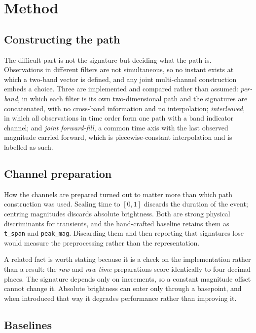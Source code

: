 \documentclass[11pt,a4paper]{report}
\begin{document}
\section{Method}

\subsection{Constructing the path}

The difficult part is not the signature but deciding what the path is. Observations in
different filters are not simultaneous, so no instant exists at which a two-band vector is
defined, and any joint multi-channel construction embeds a choice. Three are implemented and
compared rather than assumed: \emph{per-band}, in which each filter is its own
two-dimensional path and the signatures are concatenated, with no cross-band information and
no interpolation; \emph{interleaved}, in which all observations in time order form one path
with a band indicator channel; and \emph{joint forward-fill}, a common time axis with the last
observed magnitude carried forward, which is piecewise-constant interpolation and is labelled
as such.

\subsection{Channel preparation}

How the channels are prepared turned out to matter more than which path construction was
used. Scaling time to $[0,1]$ discards the duration of the event; centring magnitudes discards
absolute brightness. Both are strong physical discriminants for transients, and the
hand-crafted baseline retains them as \texttt{t\_span} and \texttt{peak\_mag}. Discarding them
and then reporting that signatures lose would measure the preprocessing rather than the
representation.

A related fact is worth stating because it is a check on the implementation rather than a
result: the \emph{raw} and \emph{raw time} preparations score identically to four decimal
places. The signature depends only on increments, so a constant magnitude offset cannot change
it. Absolute brightness can enter only through a basepoint, and when introduced that way it
degrades performance rather than improving it.

\subsection{Baselines}
\end{document}
